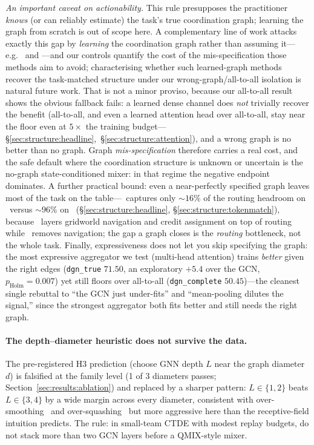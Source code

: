\emph{An important caveat on actionability.} This rule presupposes the
practitioner \emph{knows} (or can reliably estimate) the task's true
coordination graph; learning the graph from scratch is out of scope here. A
complementary line of work attacks exactly this gap by \emph{learning} the
coordination graph rather than assuming it---e.g.\ 
\citep{li_2021_dicg} and  \citep{wang_2022_casec}---and our
controls quantify the cost of the mis-specification those methods aim to avoid;
characterising whether such learned-graph methods recover the task-matched
structure under our wrong-graph/all-to-all isolation is natural future work. That
is not a minor proviso, because our all-to-all result shows the obvious
fallback fails: a learned dense channel does \emph{not} trivially recover the
benefit (all-to-all, and even a learned attention head over all-to-all, stay
near the floor even at $5\times$ the training
budget---\S\ref{sec:structure:headline},~\S\ref{sec:structure:attention}),
and a wrong graph is no better than no graph. Graph \emph{mis-specification}
therefore carries a real cost, and the safe default where the coordination
structure is unknown or uncertain is the no-graph state-conditioned mixer: in
that regime the negative endpoint dominates. A further practical bound: even a
near-perfectly specified graph leaves most of the task on the table---\gtrue\
captures only ${\sim}16\%$ of the routing headroom on \pairrouting\ versus
${\sim}96\%$ on \tokenmatch\ (\S\ref{sec:structure:headline},
\S\ref{sec:structure:tokenmatch}), because \pairrouting\ layers gridworld
navigation and credit assignment on top of routing while \tokenmatch\ removes
navigation; the gap a graph closes is the \emph{routing} bottleneck, not the
whole task. Finally, expressiveness does not let you skip specifying the graph:
the most expressive aggregator we test (multi-head attention) trains
\emph{better} given the right edges (\texttt{dgn\_true} $71.50$, an
exploratory $+5.4$ over the GCN, $p_{\text{Holm}}=0.007$) yet still floors
over all-to-all
(\texttt{dgn\_complete} $50.45$)---the cleanest single rebuttal to ``the GCN
just under-fits'' and ``mean-pooling dilutes the signal,'' since the strongest
aggregator both fits better and still needs the right graph.

\paragraph{The depth--diameter heuristic does not survive the data.} The
pre-registered H3 prediction (choose GNN depth $L$ near the graph
diameter $d$) is falsified at the family level (1 of 3 diameters passes;
Section~\ref{sec:results:ablation}) and replaced by a sharper pattern:
$L\in\{1,2\}$ beats $L\in\{3,4\}$ by a wide margin across every diameter,
consistent with over-smoothing~\citep{li_2018_oversmoothing} and
over-squashing~\citep{alon_2021_oversquashing} but more aggressive here than the
receptive-field intuition predicts. The rule: in small-team CTDE with
modest replay budgets, do not stack more than two GCN layers before a
QMIX-style mixer.

